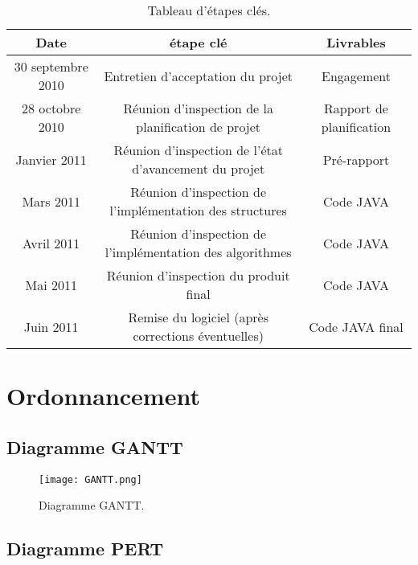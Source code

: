 \documentclass[runningheads]{llncs}
\begin{document}
\begin{table}[htbp]
\begin{center}
\begin{tabular}{|c||c|c|}
\hline
Date & \'etape cl\'e & Livrables\\
\hline\hline
30 septembre 2010 & Entretien d'acceptation du projet & Engagement\\
\hline
28 octobre 2010 & R\'eunion d'inspection de la planification de projet & Rapport de planification  \\
\hline
Janvier 2011 & Réunion d'inspection de l'état d'avancement du projet & Pré-rapport \\
\hline
Mars 2011 & Réunion d'inspection de l'implémentation des structures & Code JAVA \\
\hline
Avril 2011 & Réunion d'inspection de l'implémentation des algorithmes & Code JAVA \\
\hline
Mai 2011 & Réunion d'inspection du produit final & Code JAVA \\
\hline
Juin 2011 & Remise du logiciel (après corrections éventuelles) & Code JAVA final \\
\hline
\end{tabular}
\end{center}
   \caption{Tableau d'\'etapes cl\'es.}
   \label{tab:TEC}
\end{table}

\newpage
\section{Ordonnancement}

\subsection{Diagramme GANTT}

\begin{figure}[!htb]
\begin{center}
  \texttt{[image: GANTT.png]}
  \caption{Diagramme GANTT.}\label{fig:GANTT}
\end{center}
\end{figure}

\subsection{Diagramme PERT}
\end{document}
